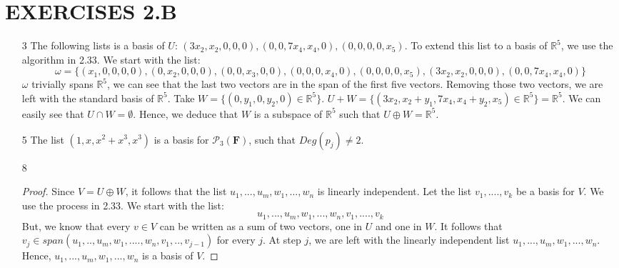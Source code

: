 \documentclass{article}
\begin{document}
\section*{EXERCISES 2.B}
\begin{enumerate}
\item[3]The following lists is a basis of $U$: $(3x_2,x_2,0,0,0),(0,0,7x_4,x_4,0),(0,0,0,0,x_5)$. To extend this list to a basis of $\mathbb{R}^5$, we use the algorithm in 2.33. We start with the list:
\begin{equation*}
\omega = \{(x_1,0,0,0,0),(0,x_2,0,0,0),(0,0,x_3,0,0),(0,0,0,x_4,0),(0,0,0,0,x_5),(3x_2,x_2,0,0,0),(0,0,7x_4,x_4,0)\}
\end{equation*}
$\omega$ trivially spans $\mathbb{R}^5$, we can see that the last two vectors are in the span of the first five vectors. Removing those two vectors, we are left with the standard basis of $\mathbb{R}^5$. Take $W = \{ (0,y_1,0,y_2,0) \in \mathbb{R}^5 \}$. $U+W = \{ {(3x_2,x_2+y_1,7x_4,x_4+y_2,x_5) \in \mathbb{R}^5} \} = \mathbb{R}^5$. We can easily see that $U \cap W = \emptyset$. Hence, we deduce that $W$ is a subspace of $\mathbb{R}^5$ such that $U \oplus W = \mathbb{R}^5$.
\item[5]
The list $(1,x,x^2+x^3,x^3)$ is a basis for $\mathcal{P}_3(\bm{F})$, such that $Deg(p_j) \neq 2$.
\item[8]
\begin{proof}
Since $V = U \oplus W$, it follows that the list $u_1,...,u_m,w_1,...,w_n$ is linearly independent. Let the list $v_1,....,v_k$ be a basis for $V$. We use the process in 2.33. We start with the list:
\begin{equation*}
u_1,...,u_m,w_1,...,w_n,v_1,....,v_k
\end{equation*}
But, we know that every $v \in V$ can be written as a sum of two vectors, one in $U$ and one in $W$. It follows that $v_{j} \in span(u_1,..,u_m,w_1,....,w_n,v_1,..,v_{j-1})$ for every $j$. At step $j$, we are left with the linearly independent list $u_1,...,u_m,w_1,...,w_n$. Hence, $u_1,...,u_m,w_1,...,w_n$ is a basis of $V$.
\end{proof}
\end{enumerate}
\end{document}
